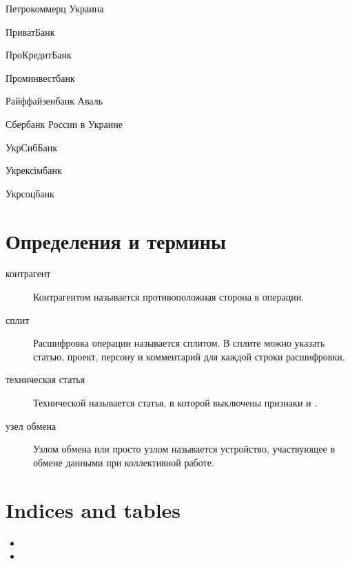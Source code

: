 \documentclass[a4paper,10pt,russian]{sphinxmanual}
\begin{document}
Петрокоммерц Украина

ПриватБанк

ПроКредитБанк

Проминвестбанк

Райффайзенбанк Аваль

Сбербанк России в Украине

УкрСибБанк

Укрексімбанк

Укрсоцбанк


\chapter{Определения и термины}
\label{\detokenize{glossary:chapter-index}}\label{\detokenize{glossary:id1}}\label{\detokenize{glossary::doc}}\begin{description}
\item[{контрагент\label{\detokenize{glossary:term-2}}}] \leavevmode
Контрагентом называется противоположная сторона в операции.

\item[{сплит\label{\detokenize{glossary:term}}}] \leavevmode
Расшифровка операции называется сплитом. В сплите можно указать статью, проект, персону и комментарий
для каждой строки расшифровки.

\item[{техническая статья\label{\detokenize{glossary:term-3}}}] \leavevmode
Технической называется статья, в которой выключены признаки  и .

\item[{узел обмена\label{\detokenize{glossary:term-1}}}] \leavevmode
Узлом обмена или просто узлом называется устройство, участвующее в обмене данными при коллективной работе.

\end{description}


\chapter{Indices and tables}
\label{\detokenize{index:indices-and-tables}}\begin{itemize}
\item {} 

\item {} 

\end{itemize}



\renewcommand{\indexname}{Алфавитный указатель}
\printindex
\end{document}
